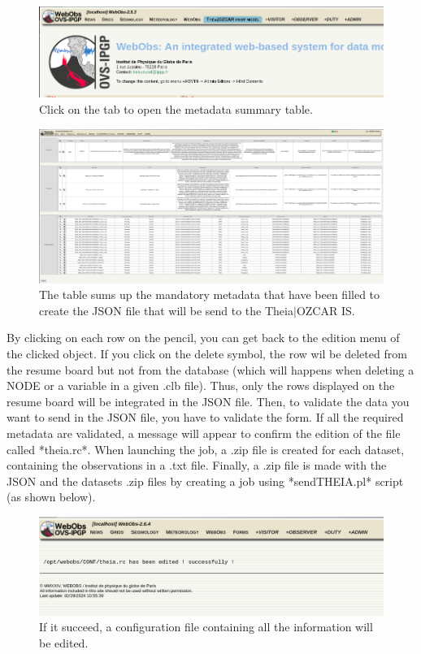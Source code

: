 \begin{figure}[!h]
	\centering
	\includegraphics[width=\textwidth]{figures/theia_tab.png}
	\caption{Click on the tab to open the metadata summary table.}
	\label{showTHEIA}
\end{figure}

\begin{figure}[!h]
	\centering
	\includegraphics[width=\textwidth]{figures/theia_recap_table.png}
	\caption{The table sums up the mandatory metadata that have been filled to create the JSON file that will be send to the Theia$\vert$OZCAR IS.}
	\label{showTHEIA2}
\end{figure}

By clicking on each row on the pencil, you can get back to the edition menu of the clicked object. If you click on the delete symbol, the row wil be deleted from the resume board but not from the database (which will happens when deleting a NODE or a variable in a given .clb file). Thus, only the rows displayed on the resume board will be integrated in the JSON file. Then, to validate the data you want to send in the JSON file, you have to validate the form. If all the required metadata are  validated, a message will appear to confirm the edition of the file called *theia.rc*. When launching the job, a .zip file is created for each dataset, containing the observations in a .txt file. Finally, a .zip file is made with the JSON and the datasets .zip files by creating a job using *sendTHEIA.pl* script (as shown below).

\newpage

\begin{figure}[!h]
	\centering
	\includegraphics[scale=0.25]{figures/theia_rc.png}
	\caption{If it succeed, a configuration file containing all the information will be edited.}
	\label{theia.rc}
\end{figure}

